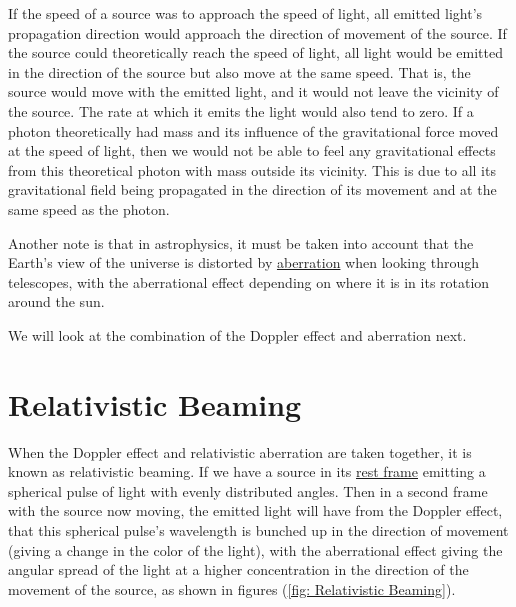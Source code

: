 
If the speed of a source was to approach the speed of light, all emitted light's propagation direction would approach the direction of movement of the source.
If the source could theoretically reach the speed of light, all light would be emitted in the direction of the source but also move at the same speed.
That is, the source would move with the emitted light, and it would not leave the vicinity of the source.
The rate at which it emits the light would also tend to zero.
If a photon theoretically had mass and its influence of the gravitational force moved at the speed of light, then we would not be able to feel any gravitational effects from this theoretical photon with mass outside its vicinity.
This is due to all its gravitational field being propagated in the direction of its movement and at the same speed as the photon.

Another note is that in astrophysics, it must be taken into account that the Earth's view of the universe is distorted by \hyperlink{def-aberration}{aberration} when looking through telescopes, with the aberrational effect depending on where it is in its rotation around the sun.

We will look at the combination of the Doppler effect and aberration next.


\section{Relativistic Beaming} \label{sect: Relativistic Beaming}

When the Doppler effect and relativistic aberration are taken together, it is known as relativistic beaming.
If we have a source in its \hyperlink{def-proper-frame}{rest frame} emitting a spherical pulse of light with evenly distributed angles.
Then in a second frame with the source now moving, the emitted light will have from the Doppler effect, that this spherical pulse's wavelength is bunched up in the direction of movement (giving a change in the color of the light), with the aberrational effect giving the angular spread of the light at a higher concentration in the direction of the movement of the source, as shown in figures (\ref{fig: Relativistic Beaming}).

